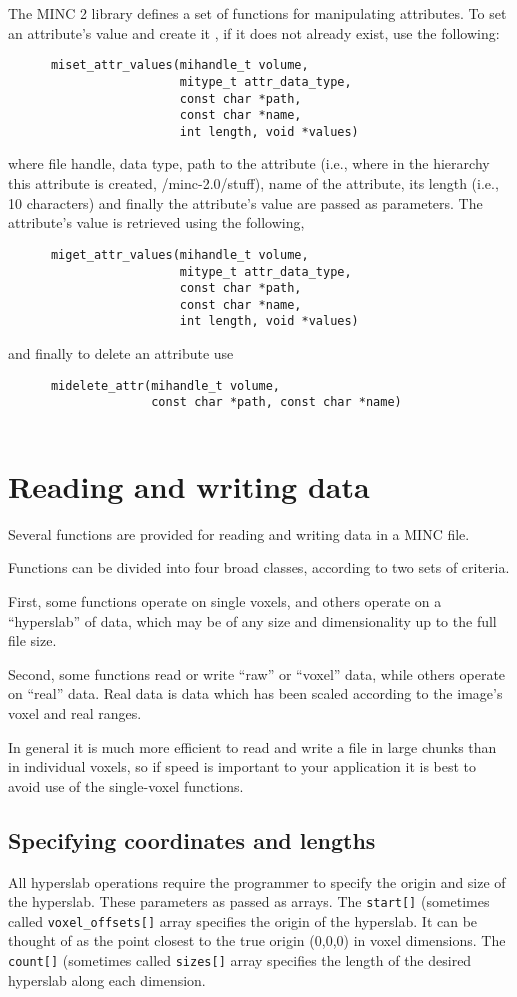 \documentclass{article}
\begin{document}
The MINC 2 library defines a set of functions for manipulating attributes. To set 
an attribute's value and
create it , if it does not already exist, use the following:
\begin{verbatim}
      miset_attr_values(mihandle_t volume, 
                        mitype_t attr_data_type,
                        const char *path, 
                        const char *name,
                        int length, void *values)
\end{verbatim}
where file handle, data type, path to the attribute (i.e., where in the hierarchy this
attribute is created, /minc-2.0/stuff), name of the attribute, its length (i.e., 10 
characters) and finally the attribute's value are passed as parameters. 
The attribute's value is retrieved using the following,
\begin{verbatim}
      miget_attr_values(mihandle_t volume,
                        mitype_t attr_data_type,
                        const char *path, 
                        const char *name,
                        int length, void *values)
\end{verbatim}
and finally to delete an attribute use
\begin{verbatim}
      midelete_attr(mihandle_t volume, 
                    const char *path, const char *name)
                       
\end{verbatim}
\section{Reading and writing data}
Several functions are provided for reading and writing data in a MINC 
file.

Functions can be divided into four broad classes, according to two 
sets of criteria.

First, some functions operate on single voxels, and others operate on
a ``hyperslab'' of data, which may be of any size and dimensionality up to the 
full file size.

Second, some functions read or write ``raw'' or ``voxel'' data, while others
operate on ``real'' data.  Real data is data which has been scaled according
to the image's voxel and real ranges.

In general it is much more efficient to read and write a file in large
chunks than in individual voxels, so if speed is important to your
application it is best to avoid use of the single-voxel functions.

\subsection{Specifying coordinates and lengths}
All hyperslab operations require the programmer to specify the origin
and size of the hyperslab.  These parameters as passed as arrays.  The
{\tt start[]} (sometimes called {\tt voxel\_offsets[]} array
specifies the origin of the hyperslab.  It can be thought of as the
point closest to the true origin (0,0,0) in voxel dimensions.  The
{\tt count[]} (sometimes called {\tt sizes[]} array specifies the length
of the desired hyperslab along each dimension.
\end{document}
